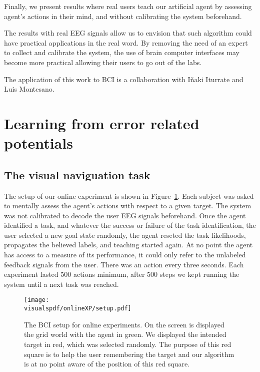Finally, we present results where real users teach our artificial agent by assessing agent's actions in their mind, and without calibrating the system beforehand.

The results with real EEG signals allow us to envision that such algorithm could have practical applications in the real word. By removing the need of an expert to collect and calibrate the system, the use of brain computer interfaces may become more practical allowing their users to go out of the labs.

The application of this work to BCI is a collaboration with I{\~n}aki Iturrate and Luis Montesano.

\section{Learning from error related potentials}
\label{chapter:bci:setupandeeg}

\subsection{The visual naviguation task}

The setup of our online experiment is shown in Figure~\ref{fig:BCIsetup}. Each subject was asked to mentally assess the agent's actions with respect to a given target. The system was not calibrated to decode the user EEG signals beforehand. Once the agent identified a task, and whatever the success or failure of the task identification, the user selected a new goal state randomly, the agent reseted the task likelihoods, propagates the believed labels, and teaching started again. At no point the agent has access to a measure of its performance, it could only refer to the unlabeled feedback signals from the user. There was an action every three seconds. Each experiment lasted 500 actions minimum, after 500 steps we kept running the system until a next task was reached.

\begin{figure}[!htbp]
\centering
\texttt{[image: \\visualspdf/onlineXP/setup.pdf]}
\caption{The BCI setup for online experiments. On the screen is displayed the grid world with the agent in green. We displayed the intended target in red, which was selected randomly. The purpose of this red square is to help the user remembering the target and our algorithm is at no point aware of the position of this red square.}
\label{fig:BCIsetup}
\end{figure}

